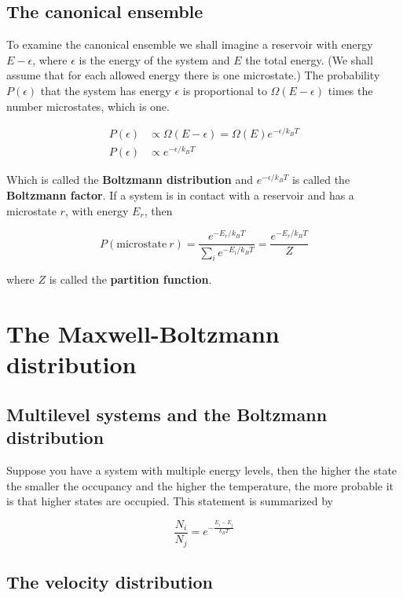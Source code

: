 \documentclass[a4paper]{article}
\begin{document}
\subsection{The canonical ensemble}

To examine the canonical ensemble we shall imagine a reservoir with energy $E-\epsilon$, where $\epsilon$ is the energy of the system and $E$ the total energy. (We shall assume that for each allowed energy there is one microstate.) The probability $P(\epsilon)$ that the system has energy $\epsilon$ is proportional to $\Omega(E-\epsilon)$ times the number microstates, which is one.


\begin{align}
	P(\epsilon)&\propto \Omega(E-\epsilon)=\Omega(E) e^{-\epsilon/k_BT}\\[1em]
    P(\epsilon)&\propto e^{-\epsilon/k_BT}
\end{align}

Which is called the \textbf{Boltzmann distribution} and $e^{-\epsilon/k_BT}$ is called the \textbf{Boltzmann factor}. If a system is in contact with a reservoir and has a microstate $r$, with energy $E_r$, then

\begin{equation}
	P(\text{microstate}\ r)=\frac{e^{-E_r/k_BT}}{\sum_i e^{-E_i/k_BT}}=\frac{e^{-E_r/k_BT}}{Z}
\end{equation}

where $Z$ is called the \textbf{partition function}.

\section{The Maxwell-Boltzmann distribution}

\subsection{Multilevel systems and the Boltzmann distribution}

Suppose you have a system with multiple energy levels, then the higher the state the smaller the occupancy and the higher the temperature, the more probable it is that higher states are occupied. This statement is summarized by

\begin{equation}
	\frac{N_i}{N_j}=e^{-\frac{E_i-E_j}{k_BT}}
\end{equation}

\subsection{The velocity distribution}
\end{document}
